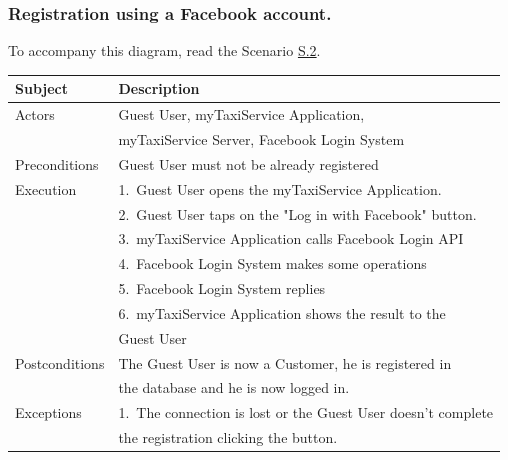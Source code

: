 \subsubsection{Registration using a Facebook account.}

	To accompany this diagram, read the Scenario \hyperref[sec:FacebookCustomerRegistrationScenario]{S.2}.

				\begin{table}[htpb]
					\centering
					\label{tab:FacebookCustomerRegistrationDiagramTable}
					\begin{tabularx}{\textwidth}{lp{9cm}}
						\hline
						\hline
							\textbf{Subject}
						& 
							\textbf{Description}\\
						\hline
							Actors	       &  Guest User, myTaxiService Application, \\
							               &  myTaxiService Server, Facebook Login System\\
						\hline
							Preconditions  &  Guest User must not be already registered\\
						\hline
							Execution      &  1.~Guest User opens the myTaxiService Application.\\
										   &  2.~Guest User taps on the "Log in with Facebook" button.\\
										   &  3.~myTaxiService Application calls Facebook Login API\\
										   &  4.~Facebook Login System makes some operations\\
										   &  5.~Facebook Login System replies\\
										   &  6.~myTaxiService Application shows the result to the \\
										   &     Guest User\\
						\hline
							Postconditions &  The Guest User is now a Customer, he is registered in \\ 
										   &  the database and he is now logged in.\\
						\hline
							Exceptions     &  1.~The connection is lost or the Guest User doesn't complete\\ 
										   &     the registration clicking the button.\\
									
						\hline
						\hline
					\end{tabularx}
				\end{table}

